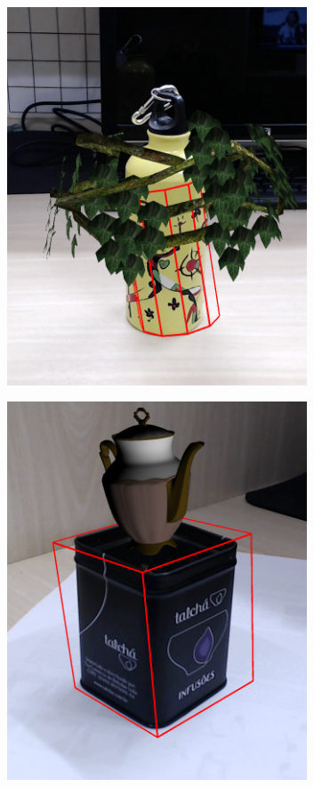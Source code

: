 \documentclass[annual]{acmsiggraph}
\begin{document}
\begin{figure}[h]
\begin{subfigure}[c]{0.33\columnwidth} \includegraphics[width=0.98\textwidth]{images/res3D_cy2.png} \end{subfigure}%
\begin{subfigure}[c]{0.33\columnwidth} \includegraphics[width=0.98\textwidth]{images/res3D_teabox.png} \end{subfigure}%

\end{figure}
\end{document}
